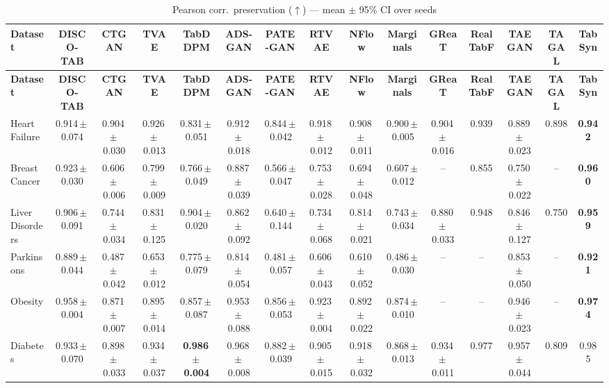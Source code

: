\documentclass[8pt]{extarticle}
\begin{document}
\begin{longtable}{l*{14}{c}}
\caption{Pearson corr.\ preservation ($\uparrow$) --- mean $\pm$ 95\% CI over seeds}\\
\toprule
\textbf{Dataset} & \textbf{DISCO-TAB} & \textbf{CTGAN} & \textbf{TVAE} & \textbf{TabDDPM} & \textbf{ADS-GAN} & \textbf{PATE-GAN} & \textbf{RTVAE} & \textbf{NFlow} & \textbf{Marginals} & \textbf{GReaT} & \textbf{RealTabF} & \textbf{TAEGAN} & \textbf{TAGAL} & \textbf{TabSyn} \\
\midrule
\endfirsthead
\toprule
\textbf{Dataset} & \textbf{DISCO-TAB} & \textbf{CTGAN} & \textbf{TVAE} & \textbf{TabDDPM} & \textbf{ADS-GAN} & \textbf{PATE-GAN} & \textbf{RTVAE} & \textbf{NFlow} & \textbf{Marginals} & \textbf{GReaT} & \textbf{RealTabF} & \textbf{TAEGAN} & \textbf{TAGAL} & \textbf{TabSyn} \\
\midrule
\endhead
\bottomrule
\endfoot
Heart Failure & 0.914\,$\pm$\,0.074 & 0.904\,$\pm$\,0.030 & 0.926\,$\pm$\,0.013 & 0.831\,$\pm$\,0.051 & 0.912\,$\pm$\,0.018 & 0.844\,$\pm$\,0.042 & 0.918\,$\pm$\,0.012 & 0.908\,$\pm$\,0.011 & 0.900\,$\pm$\,0.005 & 0.904\,$\pm$\,0.016 & 0.939 & 0.889\,$\pm$\,0.023 & 0.898 & \textbf{0.942} \\
Breast Cancer & 0.923\,$\pm$\,0.030 & 0.606\,$\pm$\,0.006 & 0.799\,$\pm$\,0.009 & 0.766\,$\pm$\,0.049 & 0.887\,$\pm$\,0.039 & 0.566\,$\pm$\,0.047 & 0.753\,$\pm$\,0.028 & 0.694\,$\pm$\,0.048 & 0.607\,$\pm$\,0.012 & -- & 0.855 & 0.750\,$\pm$\,0.022 & -- & \textbf{0.960} \\
Liver Disorders & 0.906\,$\pm$\,0.091 & 0.744\,$\pm$\,0.034 & 0.831\,$\pm$\,0.125 & 0.904\,$\pm$\,0.020 & 0.862\,$\pm$\,0.092 & 0.640\,$\pm$\,0.144 & 0.734\,$\pm$\,0.068 & 0.814\,$\pm$\,0.021 & 0.743\,$\pm$\,0.034 & 0.880\,$\pm$\,0.033 & 0.948 & 0.846\,$\pm$\,0.127 & 0.750 & \textbf{0.959} \\
Parkinsons & 0.889\,$\pm$\,0.044 & 0.487\,$\pm$\,0.042 & 0.653\,$\pm$\,0.012 & 0.775\,$\pm$\,0.079 & 0.814\,$\pm$\,0.054 & 0.481\,$\pm$\,0.057 & 0.606\,$\pm$\,0.043 & 0.610\,$\pm$\,0.052 & 0.486\,$\pm$\,0.030 & -- & -- & 0.853\,$\pm$\,0.050 & -- & \textbf{0.921} \\
Obesity & 0.958\,$\pm$\,0.004 & 0.871\,$\pm$\,0.007 & 0.895\,$\pm$\,0.014 & 0.857\,$\pm$\,0.087 & 0.953\,$\pm$\,0.088 & 0.856\,$\pm$\,0.053 & 0.923\,$\pm$\,0.004 & 0.892\,$\pm$\,0.022 & 0.874\,$\pm$\,0.010 & -- & -- & 0.946\,$\pm$\,0.023 & -- & \textbf{0.974} \\
Diabetes & 0.933\,$\pm$\,0.070 & 0.898\,$\pm$\,0.033 & 0.934\,$\pm$\,0.037 & \textbf{0.986\,$\pm$\,0.004} & 0.968\,$\pm$\,0.008 & 0.882\,$\pm$\,0.039 & 0.905\,$\pm$\,0.015 & 0.918\,$\pm$\,0.032 & 0.868\,$\pm$\,0.013 & 0.934\,$\pm$\,0.011 & 0.977 & 0.957\,$\pm$\,0.044 & 0.809 & 0.985 \\

\end{longtable}
\end{document}
